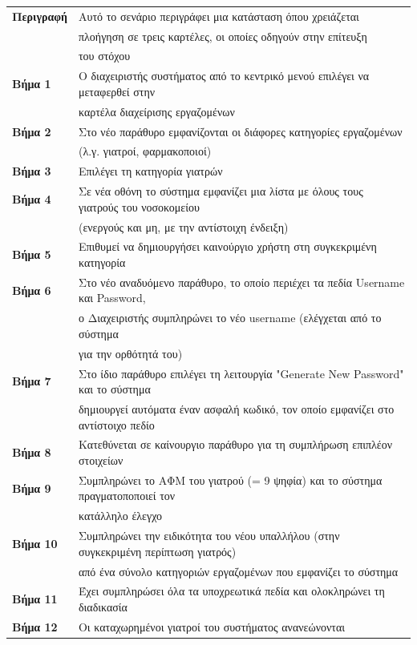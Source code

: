 \documentclass{article}
\newcommand\T{\rule{0pt}{2.6ex}}       %
\newcommand\B{\rule[-1.2ex]{0pt}{0pt}}
\begin{document}
 \begin{center}
     \begin{tabular}{|l|l|}
     \hline
      \textbf{Περιγραφή} & Αυτό το σενάριο περιγράφει μια κατάσταση όπου χρειάζεται \T \\& πλοήγηση σε τρεις καρτέλες, οι οποίες οδηγούν στην επίτευξη \\& του στόχου \B \\ 
      \hline
      \textbf{Βήμα 1} & Ο διαχειριστής συστήματος από το κεντρικό μενού επιλέγει να μεταφερθεί στην \T \\& καρτέλα διαχείρισης εργαζομένων \T\B \\
      \hline
      \textbf{Βήμα 2} & Στο νέο παράθυρο εμφανίζονται οι διάφορες κατηγορίες εργαζομένων \T \\& (λ.γ. γιατροί, φαρμακοποιοί) \B \\
      \hline
      \textbf{Βήμα 3} & Επιλέγει τη κατηγορία γιατρών \T\B \\
      \hline
      \textbf{Βήμα 4} & Σε νέα οθόνη το σύστημα εμφανίζει μια λίστα με όλους τους γιατρούς του νοσοκομείου \T \\& (ενεργούς και μη, με την αντίστοιχη ένδειξη) \B \\
      \hline
      \textbf{Βήμα 5} & Επιθυμεί να δημιουργήσει καινούργιο χρήστη στη συγκεκριμένη κατηγορία \T\B \\
      \hline
      \textbf{Βήμα 6} & Στο νέο αναδυόμενο παράθυρο, το οποίο περιέχει τα πεδία Username και Password, \T \\& ο Διαχειριστής συμπληρώνει το νέο username (ελέγχεται από το σύστημα \\& για την ορθότητά του) \B \\
      \hline
      \textbf{Βήμα 7} & Στο ίδιο παράθυρο επιλέγει τη λειτουργία "Generate New Password" και το σύστημα \T \\& δημιουργεί αυτόματα έναν ασφαλή κωδικό, τον οποίο εμφανίζει στο αντίστοιχο πεδίο\B \\
      \hline
       \textbf{Βήμα 8} & Κατεθύνεται σε καίνουργιο παράθυρο για τη συμπλήρωση επιπλέον στοιχείων \T\B \\
      \hline
      \textbf{Βήμα 9} & Συμπληρώνει το ΑΦΜ του γιατρού (= 9 ψηφία) και το σύστημα πραγματοποποιεί τον\T\\& κατάλληλο έλεγχο \B \\
      \hline
      \textbf{Βήμα 10} & Συμπληρώνει την ειδικότητα του νέου υπαλλήλου (στην συγκεκριμένη περίπτωση γιατρός) \T \\& από ένα σύνολο κατηγοριών εργαζομένων που εμφανίζει το σύστημα \B \\
      \hline
      \textbf{Βήμα 11} & Έχει συμπληρώσει όλα τα υποχρεωτικά πεδία και ολοκληρώνει τη διαδικασία \T\B \\
      \hline
      \textbf{Βήμα 12} & Οι καταχωρημένοι γιατροί του συστήματος ανανεώνονται \T\B \\
      \hline
     \end{tabular}
 \end{center}
 
\end{document}
